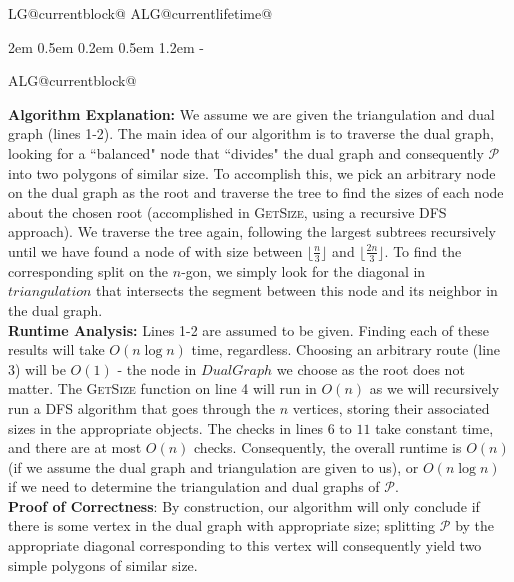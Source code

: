 \documentclass[11pt]{article}
\makeatletter
\newlength{\continueindent}
\renewenvironment{algorithmic}[1][0]%
   {%
   \edef\ALG@numberfreq{#1}%
   \def\@currentlabel{\theALG@line}%
   \setcounter{ALG@line}{0}%
   \setcounter{ALG@rem}{0}%
   \let\\\algbreak%
   \expandafter\edef\csname ALG@currentblock@\theALG@nested\endcsname{0}%
   \expandafter\let\csname ALG@currentlifetime@\theALG@nested\endcsname\relax%
   \begin{list}%
      {\ALG@step}%
      {%
      \rightmargin\z@%
      \itemsep\z@ \itemindent\z@ \listparindent2em%
      \partopsep\z@ \parskip\z@ \parsep\z@%
      \labelsep 0.5em \topsep 0.2em%
      \ifthenelse{\equal{#1}{0}}%
         {\labelwidth 0.5em}%
         {\labelwidth 1.2em}%
       \leftmargin\labelwidth \addtolength{\leftmargin}{\labelsep}
      \ALG@tlm\z@%
      }%
      \parshape 2 \leftmargin \linewidth \continueindent \dimexpr\linewidth-\continueindent\relax
   \setcounter{ALG@nested}{0}%
   \ALG@beginalgorithmic%
   }%
   {%
   \ALG@closeloops%
   \expandafter\ifnum\csname ALG@currentblock@\theALG@nested\endcsname=0\relax%
   \else%
      \PackageError{algorithmicx}{Some blocks are not closed!!!}{}%
   \fi%
   \ALG@endalgorithmic%
   \end{list}%
   }%
\makeatother
\begin{document}
\begin{enumerate}
\begin{minipage}[t]{0.9\textwidth}
\begin{algorithm}[H]
\begin{algorithmic}[1]
    \end{algorithmic}
    \end{algorithm}
\end{minipage}
\vspace{1cm}
    
\textbf{Algorithm Explanation:} We assume we are given the triangulation and dual graph (lines 1-2). The main idea of our algorithm is to traverse the dual graph, looking for a ``balanced" node that ``divides" the dual graph and consequently $\mathcal{P}$ into two polygons of similar size. To accomplish this, we pick an arbitrary node on the dual graph as the root and traverse the tree to find the sizes of each node about the chosen root (accomplished in \textsc{GetSize}, using a recursive DFS approach). We traverse the tree again, following the largest subtrees recursively until we have found a node of with size between $\lfloor \frac{n}{3} \rfloor$ and $\lfloor \frac{2n}{3} \rfloor$. To find the corresponding split on the $n$-gon, we simply look for the diagonal in $triangulation$ that intersects the segment between this node and its neighbor in the dual graph. \\

\textbf{Runtime Analysis:} Lines 1-2 are assumed to be given. Finding each of these results will take $O(n\log n )$ time, regardless. Choosing an arbitrary route (line 3) will be $O(1)$ - the node in $DualGraph$ we choose as the root does not matter. The \textsc{GetSize} function on line 4 will run in $O(n)$ as we will recursively run a DFS algorithm that goes through the $n$ vertices, storing their associated sizes in the appropriate objects. The checks in lines $6$ to $11$ take constant time, and there are at most $O(n)$ checks. Consequently, the overall runtime is $O(n)$ (if we assume the dual graph and triangulation are given to us), or $O(n \log n)$ if we need to determine the triangulation and dual graphs of $\mathcal{P}$. \\

\textbf{Proof of Correctness}: By construction, our algorithm will only conclude if there is some vertex in the dual graph with appropriate size; splitting $\mathcal{P}$ by the appropriate diagonal corresponding to this vertex will consequently yield two simple polygons of similar size. \\


\end{enumerate}
\end{document}
